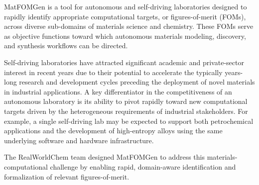


MatFOMGen is a tool for autonomous and self-driving laboratories designed to rapidly identify appropriate computational targets, or figures-of-merit (FOMs), across diverse sub-domains of materials science and chemistry. These FOMs serve as objective functions toward which autonomous materials modeling, discovery, and synthesis workflows can be directed.  

Self-driving laboratories have attracted significant academic \cite{ceder_alab, alabos} and private-sector interest in recent years due to their potential to accelerate the typically years-long research and development cycles preceding the deployment of novel materials in industrial applications. A key differentiator in the competitiveness of an autonomous laboratory is its ability to pivot rapidly toward new computational targets driven by the heterogeneous requirements of industrial stakeholders. For example, a single self-driving lab may be expected to support both petrochemical applications and the development of high-entropy alloys using the same underlying software and hardware infrastructure.  

The RealWorldChem team designed MatFOMGen to address this materials-computational challenge by enabling rapid, domain-aware identification and formalization of relevant figures-of-merit.


